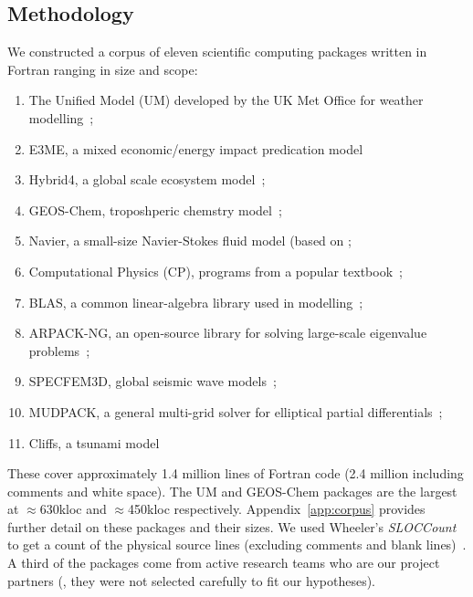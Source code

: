 \subsection{Methodology}
%
\noindent
We constructed a corpus of eleven scientific computing packages
written in Fortran ranging in size and scope:
%
\begin{enumerate}[leftmargin=1.5em]
\item The Unified Model (UM) developed by the UK Met Office
for weather modelling~\cite{um};
\item E3ME, a mixed economic/energy impact predication
  model~\cite{RePEc:aen:journl:2006se-a12}

\item Hybrid4, a global scale ecosystem model~\cite{GBC:GBC635};

\item GEOS-Chem, troposhperic chemstry model~\cite{geos-chem};

\item Navier, a small-size Navier-Stokes fluid model (based
  on \cite{griebel1997numerical};

\item Computational Physics (CP), programs from a popular
 textbook~\cite{giordano1997computational};

\item BLAS, a common linear-algebra
  library used in modelling~\cite{blas};

\item ARPACK-NG, an open-source library for solving large-scale
eigenvalue problems~\cite{arpackng};

\item SPECFEM3D, global seismic wave models~\cite{specfem3d};

\item MUDPACK, a general multi-grid solver for elliptical
partial differentials~\cite{MUD};

\item Cliffs, a tsunami model~\cite{tolkova2014land}
\end{enumerate}
%
These cover approximately 1.4 million lines of Fortran code
(2.4 million including comments and white space).  The UM and
GEOS-Chem packages are the largest at $\approx$630kloc and
$\approx$450kloc respectively.  Appendix~\ref{app:corpus} provides
further detail on these packages and their sizes.  We used Wheeler's
\emph{SLOCCount} to get a count of the physical source lines
(excluding comments and blank lines)~\cite{wheeler2001sloccount}.
A third of the packages come from active research teams who are our project
partners (\ie{}, they were not selected carefully to fit our
hypotheses).


